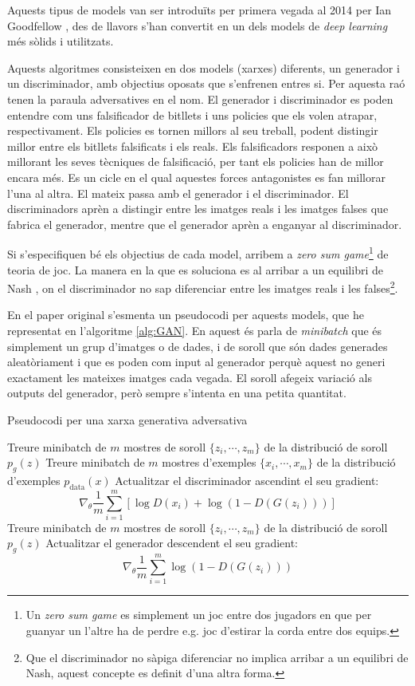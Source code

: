 Aquests tipus de models van ser introduïts per primera vegada al 2014 per Ian Goodfellow \cite{GAN2014}, des de llavors s'han convertit en un dels models de \textit{deep learning} més sòlids i utilitzats. 

Aquests algoritmes consisteixen en dos models (xarxes) diferents, un generador i un discriminador, amb objectius oposats que s'enfrenen entres si. Per aquesta raó tenen la paraula adversatives en el nom. El generador i discriminador es poden entendre com uns falsificador de bitllets i uns policies que els volen atrapar, respectivament. Els policies es tornen millors al seu treball, podent distingir millor entre els bitllets falsificats i els reals. Els falsificadors responen a això millorant les seves tècniques de falsificació, per tant els policies han de millor encara més. Es un cicle en el qual aquestes forces antagonistes es fan millorar l'una al altra. El mateix passa amb el generador i el discriminador. El discriminadors aprèn a distingir entre les imatges reals i les imatges falses que fabrica el generador, mentre que el generador aprèn a enganyar al discriminador. 

Si s'especifiquen bé els objectius de cada model, arribem a \textit{zero sum game}\footnote{Un \textit{zero sum game} es simplement un joc entre dos jugadors en que per guanyar un l'altre ha de perdre e.g. joc d'estirar la corda entre dos equips.} de teoria de joc. La manera en la que es soluciona es al arribar a un equilibri de Nash \cite{QGAN_exp}, on el discriminador no sap diferenciar entre les imatges reals i les falses\footnote{Que el discriminador no sàpiga diferenciar no implica arribar a un equilibri de Nash, aquest concepte es definit d'una altra forma.}.

En el paper original \cite{GAN2014} s'esmenta un pseudocodi per aquests models, que he representat en l'algoritme \ref{alg:GAN}. En aquest és parla de \textit{minibatch} que és simplement un grup d'imatges o de dades, i de soroll que són dades generades aleatòriament i que es poden com input al generador perquè aquest no generi exactament les mateixes imatges cada vegada. El soroll afegeix variació als outputs del generador, però sempre s'intenta en una petita quantitat. 

\begin{algorithm}
	\caption{Pseudocodi per una xarxa generativa adversativa}\label{alg:GAN}
	\begin{algorithmic}
		\State Treure minibatch de $m$ mostres de soroll $\{z_i, \cdots, z_m\}$ de la distribució de soroll $p_g(z)$
		\State Treure minibatch de $m$ mostres d'exemples $\{x_i, \cdots, x_m\}$ de la distribució d'exemples $p_{\mathrm{data}}(x)$
		\State Actualitzar el discriminador ascendint el seu gradient: 
		$$
		\nabla_\theta \frac{1}{m}\sum_{i=1}^{m}\left[\log D(x_i) + \log(1- D(G(z_i)))\right]
		$$
		\EndFor
		\State Treure minibatch de $m$ mostres de soroll $\{z_i, \cdots, z_m\}$ de la distribució de soroll $p_g(z)$
		\State Actualitzar el generador descendent el seu gradient:
		$$
		\nabla_\theta \frac{1}{m} \sum_{i=1}^{m} \log(1-D(G(z_i)))
		$$
		\EndFor
	\end{algorithmic}
\end{algorithm}

